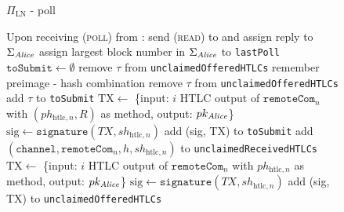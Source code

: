   \begin{figure}[H]
    \begin{protocolbox}{$\Pi_{\mathrm{LN}}$ - poll}
      \begin{algorithmic}[1]
        \State Upon receiving (\textsc{poll}) from \environment:
        \Indent
          \State send (\textsc{read}) to \ledger{} and assign reply to
          $\Sigma_{\mathit{Alice}}$
          \State assign largest block number in $\Sigma_{\mathit{Alice}}$ to
          \texttt{lastPoll}
        \State $\mathtt{toSubmit} \gets \emptyset$
             
              \State remove $\tau$ from \texttt{unclaimedOfferedHTLCs}
              \State remember preimage - hash combination
              \State remove $\tau$ from \texttt{unclaimedOfferedHTLCs}
              \State add $\tau$ to \texttt{toSubmit}
            \EndIf
          \EndFor
             
                  \State $\mathrm{TX} \gets$ \{input: $i$ HTLC output of
                  $\mathtt{remoteCom}_n$ with $\left(ph_{\mathrm{htlc}, n},
                  R\right)$ as method, output: $pk_{\mathit{Alice}}$\}
                  \State $\mathrm{sig} \gets \mathtt{signature}\left(TX,
                  sh_{\mathrm{htlc}, n}\right)$
                  \State add (sig, TX) to \texttt{toSubmit}
                \Else
                  \State add $\left(\texttt{channel}, \mathtt{remoteCom}_n, h,
                  sh_{\mathrm{htlc}, n}\right)$ to
                  \texttt{unclaimedReceivedHTLCs}
                \EndIf
              \EndFor
                \State $\mathrm{TX} \gets$ \{input: $i$ HTLC output of
                $\mathtt{remoteCom}_n$ with $ph_{\mathrm{htlc}, n}$ as method,
                output: $pk_{\mathit{Alice}}$\}
                \State $\mathrm{sig} \gets \mathtt{signature}\left(TX,
                sh_{\mathrm{htlc}, n}\right)$
                  \State add (sig, TX) to \texttt{unclaimedOfferedHTLCs}

\end{algorithmic}
\end{protocolbox}
\end{figure}
